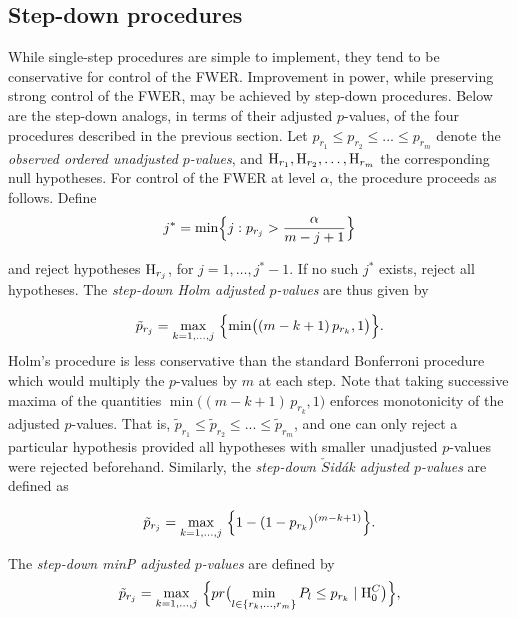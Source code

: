\documentclass[11pt]{article}
\newcommand{\scst}{\scriptstyle}
\begin{document}
\subsection{Step-down procedures}

While single-step procedures are simple to implement, they tend to be
conservative for control of the FWER. Improvement in power, while
preserving strong control of the FWER, may be achieved by step-down
procedures. Below are the step-down analogs, in terms of their
adjusted $p$-values, of the four procedures described in the previous
section. Let $p_{\scst r_1} \leq p_{\scst r_2} \leq ... \leq p_{\scst
  r_m}$ denote the {\it observed ordered unadjusted $p$-values}, and ${\rm
  H}_{\scst r_1}, {\rm H}_{\scst r_2}, \ldots, {\rm H}_{\scst r_m}$
the corresponding null hypotheses. For control of the FWER at level $\alpha$, the \cite{Holm79} procedure proceeds as follows. Define 
$$ j^* = \min \Bigl\{j: p_{\scst r_j} > \frac{\alpha}{m-j+1}\Bigr\}$$

and reject hypotheses ${\rm H}_{\scst r_j}$, for
$j=1,\ldots,j^*-1$. If no such $j^*$ exists, reject all
hypotheses. The {\it step-down Holm adjusted $p$-values} are thus given by 

\begin{equation}\label{eholm}
\tilde{p}_{\scst r_j} = \max_{k = 1,\ldots, j}\ \Bigl\{ \min \bigl( (m-k+1) \, p_{\scst r_k},1 \bigr ) \Bigr\}.
\end{equation}
Holm's procedure is less conservative than the standard Bonferroni
procedure which would multiply the $p$-values by $m$ at each
step. Note that taking successive maxima of the quantities $\min
\bigl( (m-k+1) \, p_{\scst r_k},1 \bigr )$ enforces monotonicity of
the adjusted $p$-values. That is, $\tilde{p}_{\scst r_1} \leq
\tilde{p}_{\scst r_2} \leq ... \leq \tilde{p}_{\scst r_m}$, and one
can only reject a particular hypothesis provided all hypotheses with
smaller unadjusted $p$-values were rejected beforehand. Similarly, the
{\it step-down $\check{S}$id\'{a}k adjusted $p$-values} are defined as 

\begin{equation}\label{esd}
\tilde{p}_{\scst r_j} = \max_{k = 1,\ldots, j}\ \Bigl\{ 1-(1-p_{\scst r_k})^{(m-k+1)} \Bigr\}.
\end{equation}

The \cite{Westfall&Young93} {\it step-down minP adjusted $p$-values} are defined by
\begin{equation}\label{eminP}
\tilde{p}_{\scst r_j} = \max_{k = 1,\ldots, j}\ \Bigl\{ pr\bigl(\min_{l
  \in \{r_k,\ldots,r_m\}} P_l \leq p_{\scst r_k} \mid {\rm H}_0^C \bigr) \Bigr\},
\end{equation}
\end{document}
